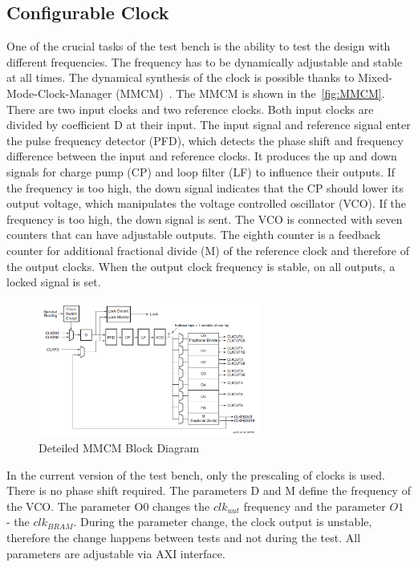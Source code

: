 \subsection{Configurable Clock}
One of the crucial tasks of the test bench is the ability to test the design with different frequencies. The frequency has to be dynamically adjustable and stable at all times. The dynamical synthesis of the clock is possible thanks to Mixed-Mode-Clock-Manager (MMCM)~\cite{manual:MMCM}. The MMCM is shown in the~\autoref{fig:MMCM}. There are two input clocks and two reference clocks. Both input clocks are divided by coefficient D at their input. The input signal and reference signal enter the pulse frequency detector (PFD), which detects the phase shift and frequency difference between the input and reference clocks. It produces the up and down signals for charge pump (CP) and loop filter (LF) to influence their outputs. If the frequency is too high, the down signal indicates that the CP should lower its output voltage, which manipulates the voltage controlled oscillator (VCO). If the frequency is too high, the down signal is sent. The VCO is connected with seven counters that can have adjustable outputs. The eighth counter is a feedback counter for additional fractional divide (M) of the reference clock and therefore of the output clocks. When the output clock frequency is stable, on all outputs, a locked signal is set.

\begin{figure}[h]
\centering
\includegraphics[width=0.65\textwidth]{figures/MMCM.png}
\caption{Deteiled MMCM Block Diagram~\cite{manual:MMCM}}
\label{fig:MMCM}
\end{figure}

In the current version of the test bench, only the prescaling of clocks is used. There is no phase shift required. The parameters D and M define the frequency of the VCO. The parameter O0 changes the $clk_{uut}$ frequency and the parameter $O1$ - the $clk_{BRAM}$. During the parameter change, the clock output is unstable, therefore the change happens between tests and not during the test. All parameters are adjustable via AXI interface. 

